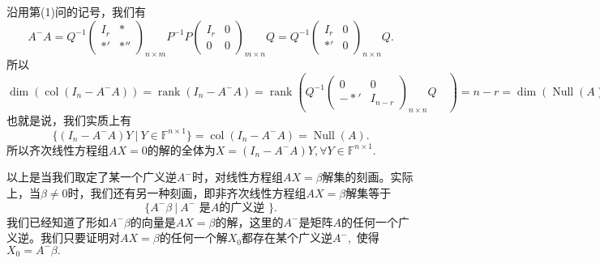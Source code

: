 沿用第(1)问的记号，我们有
$$A^-A = Q^{-1} \begin{pmatrix} I_r & * \\ *' & *'' \end{pmatrix}_{n\times m}\!\!\!\!\!\!\!\!\!\!\! P^{-1} P \begin{pmatrix} I_r & 0 \\ 0 & 0 \end{pmatrix}_{m\times n}\!\!\!\!\!\!\!\!\!\!\! Q = Q^{-1} \begin{pmatrix} I_r & 0 \\ *' & 0 \end{pmatrix}_{n\times n}\!\!\!\!\!\!\!\!\!\! Q.$$
所以
$$\dim \left( \operatorname{col}(I_n - A^-A) \right) = \operatorname{rank} (I_n - A^-A) = \operatorname{rank} \left( Q^{-1} \begin{pmatrix} 0 & 0 \\ -*' & I_{n-r} \end{pmatrix}_{n\times n}\!\!\!\!\!\!\!\!\!\! Q \hspace{1em} \right) = n - r = \dim \left( \operatorname{Null} (A) \right).$$
也就是说，我们实质上有$$\{ (I_n - A^-A)Y ~|~ Y \in \mathbb{F}^{n\times 1} \} = \operatorname{col}(I_n - A^-A) = \operatorname{Null} (A).$$
所以齐次线性方程组$AX = 0$的解的全体为$X = (I_n - A^-A)Y, \forall Y \in \mathbb{F}^{n\times 1}.$

\vspace{0.5em}

以上是当我们取定了某一个广义逆$A^-$时，对线性方程组$AX = \beta$解集的刻画。实际上，当$\beta \neq 0$时，我们还有另一种刻画，即非齐次线性方程组$AX = \beta$解集等于
$$\{ A^-\beta ~|~ A^- \text{ 是$A$的广义逆 } \}.$$
我们已经知道了形如$A^-\beta$的向量是$AX = \beta$的解，这里的$A^-$是矩阵$A$的任何一个广义逆。我们只要证明对$AX = \beta$的任何一个解$X_0$都存在某个广义逆$A^-,$ 使得$X_0 = A^-\beta.$

